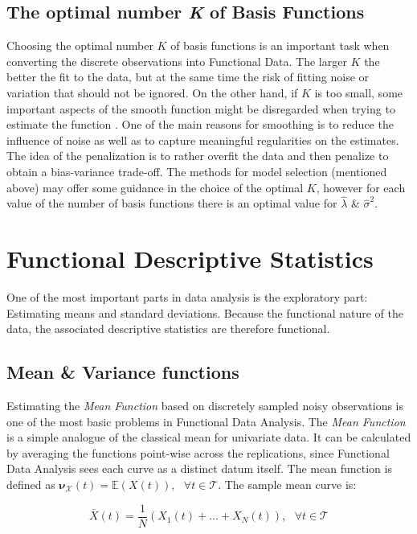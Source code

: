 \subsection{The optimal number \textit{K} of Basis Functions}
Choosing the optimal number $K$ of basis functions is an important task when converting the discrete observations into Functional Data. The larger $K$ the better the fit to the data, but at the same time the risk of fitting noise or variation that should not be ignored. On the other hand, if $K$ is too small, some important aspects of the smooth function might be disregarded when trying to estimate the function \citep{olberd:ramsay}. One of the main reasons for smoothing is to reduce the influence of noise as well as to capture meaningful regularities on the estimates. The idea of the penalization is to rather overfit the data and then penalize to obtain a bias-variance trade-off. The methods for model selection (mentioned above) may offer some guidance in the choice of the optimal $K$, however for each value of the number of basis functions there is an optimal value for $\hat{\lambda}$ \& $\hat{\sigma}^2$. 
\clearpage
\section{Functional Descriptive Statistics}
One of the most important parts in data analysis is the exploratory part: Estimating means and standard deviations. Because the functional nature of the data, the associated descriptive statistics are therefore functional.

\subsection{Mean \& Variance functions}
Estimating the \textit{Mean Function} based on discretely sampled noisy observations is one of the most basic problems in Functional Data Analysis. The \textit{Mean Function} is a simple analogue of the classical mean for univariate data. It can be calculated by averaging the functions point-wise across the replications, since Functional Data Analysis sees each curve as a distinct datum itself. The mean function is defined as $\mathbf{\nu}_{\mathcal{X}}(t)=\mathbb{E}(X(t)),\text{ }\forall t \in \mathcal{T}$. The sample mean curve is: 

\begin{equation} \label{eq:functmean}
\bar{X}(t)=\frac{1}{N}(X_{1}(t)+\dots+X_{N}(t)),\text{ }\forall t \in \mathcal{T} 
\end{equation}

